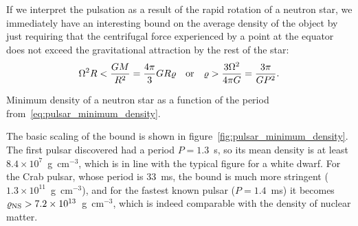 
If we interpret the pulsation as a result of the rapid rotation of a neutron star,
we immediately have an interesting bound on the average density of the object by
just requiring that the centrifugal force experienced by a point at the equator does
not exceed the gravitational attraction by the rest of the star:
\begin{align}\label{eq:pulsar_minimum_density}
	\Omega^2 R < \frac{GM}{R^2} = \frac{4\pi}{3} G R \varrho \quad\text{or}\quad
  \varrho > \frac{3 \Omega^2}{4\pi G} = \frac{3\pi}{GP^2}.
\end{align}

\begin{marginfigure}
  
  \caption{Minimum density of a neutron star as a function of the period
    from~\eqref{eq:pulsar_minimum_density}.}
  \label{fig:pulsar_minimum_density}
\end{marginfigure}

The basic scaling of the bound is shown in figure~\ref{fig:pulsar_minimum_density}.
The first pulsar discovered had a period $P = 1.3$~s, so its mean density is at
least $8.4 \times 10^7$~g~cm$^{-3}$, which is in line with the typical figure for
a white dwarf. For the Crab pulsar, whose period is $33$~ms, the bound is much
more stringent ($1.3 \times 10^{11}$~g~cm$^{-3}$), and for the fastest known pulsar
($P = 1.4$~ms) it becomes $\varrho_\text{NS} > 7.2 \times 10^{13}$~g~cm$^{-3}$,
which is indeed comparable with the density of nuclear matter.

